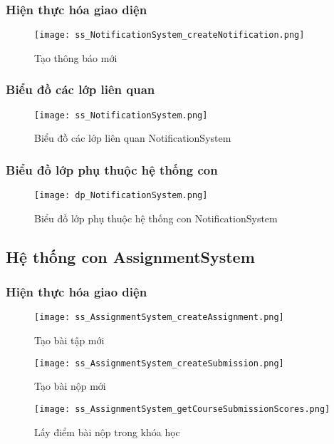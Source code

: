 \documentclass[./../main.tex]{subfiles}
\begin{document}
\subsubsection{Hiện thực hóa giao diện}
\begin{figure}[H]
    \centering
    \texttt{[image: ss\_NotificationSystem\_createNotification.png]}
    \caption{Tạo thông báo mới}
    \label{ss_ns_cn}
\end{figure}
\subsubsection{Biểu đồ các lớp liên quan}
\begin{figure}[H]
    \centering
    \texttt{[image: ss\_NotificationSystem.png]}
    \caption{Biểu đồ các lớp liên quan NotificationSystem}
    \label{ss_ns}
\end{figure}
\subsubsection{Biểu đồ lớp phụ thuộc hệ thống con}
\begin{figure}[H]
    \centering
    \texttt{[image: dp\_NotificationSystem.png]}
    \caption{Biểu đồ lớp phụ thuộc hệ thống con NotificationSystem}
    \label{dp_ns}
\end{figure}

\subsection{Hệ thống con AssignmentSystem}
\subsubsection{Hiện thực hóa giao diện}
\begin{figure}[H]
    \centering
    \texttt{[image: ss\_AssignmentSystem\_createAssignment.png]}
    \caption{Tạo bài tập mới}
    \label{ss_as_ca}
\end{figure}

\begin{figure}[H]
    \centering
    \texttt{[image: ss\_AssignmentSystem\_createSubmission.png]}
    \caption{Tạo bài nộp mới}
    \label{ss_as_cs}
\end{figure}

\begin{figure}[H]
    \centering
    \texttt{[image: ss\_AssignmentSystem\_getCourseSubmissionScores.png]}
    \caption{Lấy điểm bài nộp trong khóa học}
    \label{ss_as_gcss}
\end{figure}
\end{document}
